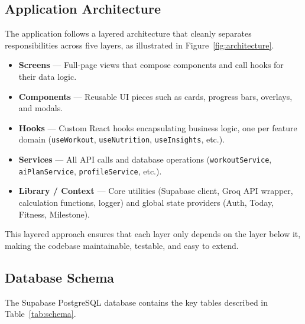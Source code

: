 \subsection{Application Architecture}

The application follows a layered architecture that cleanly separates
responsibilities across five layers, as illustrated in
Figure~\ref{fig:architecture}.

\begin{itemize}
    \item \textbf{Screens} — Full-page views that compose components and call
    hooks for their data logic.
    \item \textbf{Components} — Reusable UI pieces such as cards, progress
    bars, overlays, and modals.
    \item \textbf{Hooks} — Custom React hooks encapsulating business logic,
    one per feature domain (\texttt{useWorkout}, \texttt{useNutrition},
    \texttt{useInsights}, etc.).
    \item \textbf{Services} — All API calls and database operations
    (\texttt{workoutService}, \texttt{aiPlanService}, \texttt{profileService},
    etc.).
    \item \textbf{Library / Context} — Core utilities (Supabase client, Groq
    API wrapper, calculation functions, logger) and global state providers
    (Auth, Today, Fitness, Milestone).
\end{itemize}

This layered approach ensures that each layer only depends on the layer below
it, making the codebase maintainable, testable, and easy to extend.

\subsection{Database Schema}

The Supabase PostgreSQL database contains the key tables described in
Table~\ref{tab:schema}.

